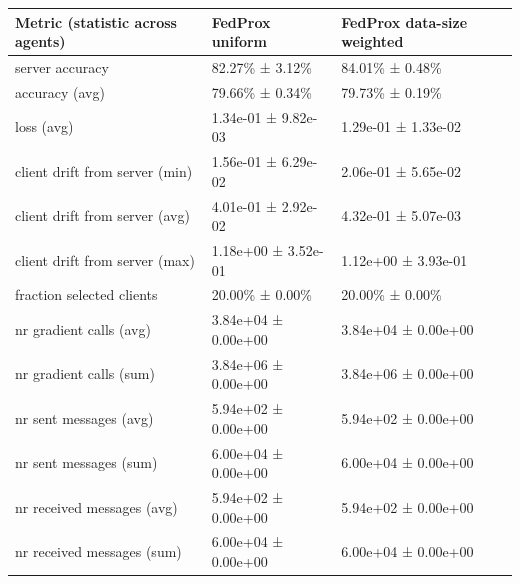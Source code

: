 \begin{tabular}{lll}
\hline
 Metric (statistic across agents)   & FedProx uniform     & FedProx data-size weighted   \\
\hline
 server accuracy                    & 82.27\% ± 3.12\%      & 84.01\% ± 0.48\%               \\
 accuracy (avg)                     & 79.66\% ± 0.34\%      & 79.73\% ± 0.19\%               \\
 loss (avg)                         & 1.34e-01 ± 9.82e-03 & 1.29e-01 ± 1.33e-02          \\
 client drift from server (min)     & 1.56e-01 ± 6.29e-02 & 2.06e-01 ± 5.65e-02          \\
 client drift from server (avg)     & 4.01e-01 ± 2.92e-02 & 4.32e-01 ± 5.07e-03          \\
 client drift from server (max)     & 1.18e+00 ± 3.52e-01 & 1.12e+00 ± 3.93e-01          \\
 fraction selected clients          & 20.00\% ± 0.00\%      & 20.00\% ± 0.00\%               \\
 nr gradient calls (avg)            & 3.84e+04 ± 0.00e+00 & 3.84e+04 ± 0.00e+00          \\
 nr gradient calls (sum)            & 3.84e+06 ± 0.00e+00 & 3.84e+06 ± 0.00e+00          \\
 nr sent messages (avg)             & 5.94e+02 ± 0.00e+00 & 5.94e+02 ± 0.00e+00          \\
 nr sent messages (sum)             & 6.00e+04 ± 0.00e+00 & 6.00e+04 ± 0.00e+00          \\
 nr received messages (avg)         & 5.94e+02 ± 0.00e+00 & 5.94e+02 ± 0.00e+00          \\
 nr received messages (sum)         & 6.00e+04 ± 0.00e+00 & 6.00e+04 ± 0.00e+00          \\
\hline
\end{tabular}